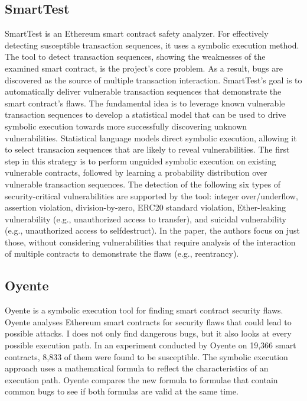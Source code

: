 \documentclass[a4paper,sigconf, language=french,
language=german, language=spanish, language=english]{acmart}
\begin{document}
\subsection{SmartTest}
SmartTest is an Ethereum smart contract safety analyzer.
For effectively detecting susceptible transaction sequences, it uses a symbolic execution method.
The tool to detect transaction sequences, showing the weaknesses of the examined smart contract, is the project's core problem.
As a result, bugs are discovered as the source of multiple transaction interaction.
SmartTest's goal is to automatically deliver vulnerable transaction sequences that demonstrate the smart contract's flaws. 
The fundamental idea is to leverage known vulnerable transaction sequences to develop a statistical model that can be used to drive symbolic execution 
towards more successfully discovering unknown vulnerabilities.
Statistical language models direct symbolic execution, allowing it to select transacion sequences that are likely to reveal vulnerabilities.
The first step in this strategy is to perform unguided symbolic execution on existing vulnerable contracts, followed by learning a probability 
distribution over vulnerable transaction sequences. The detection of the following six types of security-critical vulnerabilities are supported
by the tool: integer over/underflow, assertion violation, division-by-zero, ERC20 standard
violation, Ether-leaking vulnerability (e.g., unauthorized access to transfer), and suicidal
vulnerability (e.g., unauthorized access to selfdestruct). In the paper, the authors focus on
just those, without considering vulnerabilities that require analysis of the interaction of
multiple contracts to demonstrate the flaws (e.g., reentrancy).

\subsection{Oyente}
Oyente is a symbolic execution tool for finding smart contract security flaws.
Oyente analyses Ethereum smart contracts for security flaws that could lead to possible attacks.
I does not only find dangerous bugs, but it also looks at every possible execution path.
In an experiment conducted by Oyente on 19,366 smart contracts, 8,833 of them were found to be susceptible.
The symbolic execution approach uses a mathematical formula to reflect the characteristics of an execution path.
Oyente compares the new formula to formulae that contain common bugs to see if both formulas are valid at the same time. 
\end{document}

